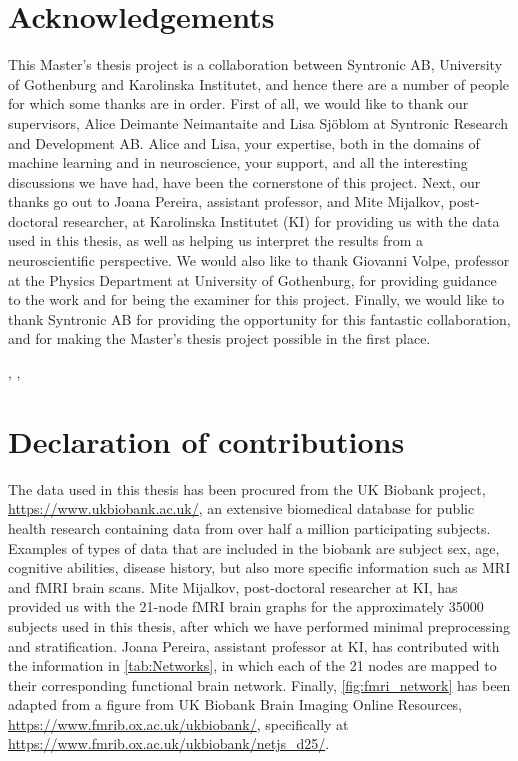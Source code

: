 \thispagestyle{plain}			%
\section*{Acknowledgements}
This Master's thesis project is a collaboration between Syntronic AB, University of Gothenburg and Karolinska Institutet, and hence there are a number of people for which some thanks are in order. First of all, we would like to thank our supervisors, Alice Deimante Neimantaite and Lisa Sjöblom at Syntronic Research and Development AB. Alice and Lisa, your expertise, both in the domains of machine learning and in neuroscience, your support, and all the interesting discussions we have had, have been the cornerstone of this project. Next, our thanks go out to Joana Pereira, assistant professor, and Mite Mijalkov, post-doctoral researcher, at Karolinska Institutet (KI) for providing us with the data used in this thesis, as well as helping us interpret the results from a neuroscientific perspective. We would also like to thank Giovanni Volpe, professor at the Physics Department at University of Gothenburg, for providing guidance to the work and for being the examiner for this project. Finally, we would like to thank Syntronic AB for providing the opportunity for this fantastic collaboration, and for making the Master's thesis project possible in the first place.


\hfill
\thesisAuthor, \thesisCity, \thesisMonth\ \thesisYear
\vspace{0.5cm}
\section*{Declaration of contributions}
The data used in this thesis has been procured from the UK Biobank project, \url{https://www.ukbiobank.ac.uk/}, an extensive biomedical database for public health research containing data from over half a million participating subjects. Examples of types of data that are included in the biobank are subject sex, age, cognitive abilities, disease history, but also more specific information such as MRI and fMRI brain scans. Mite Mijalkov, post-doctoral researcher at KI, has provided us with the 21-node fMRI brain graphs for the approximately 35000 subjects used in this thesis, after which we have performed minimal preprocessing and stratification. Joana Pereira, assistant professor at KI, has contributed with the information in \cref{tab:Networks}, in which each of the 21 nodes are mapped to their corresponding functional brain network. Finally, \cref{fig:fmri_network} has been adapted from a figure from UK Biobank Brain Imaging Online Resources, \url{https://www.fmrib.ox.ac.uk/ukbiobank/}, specifically at \url{https://www.fmrib.ox.ac.uk/ukbiobank/netjs_d25/}. 

\if{}
\newpage				%
\thispagestyle{empty}
\mbox{}
\fi
